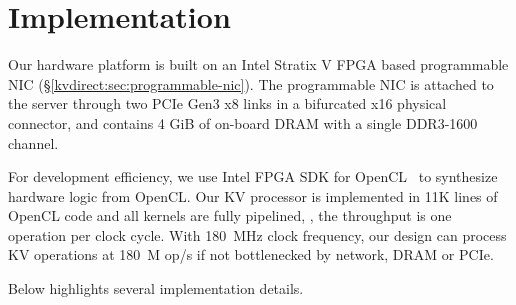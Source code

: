\section{Implementation}
\label{kvdirect:sec:implementation}

Our hardware platform is built on an Intel Stratix V FPGA based programmable NIC (\S\ref{kvdirect:sec:programmable-nic}).
The programmable NIC is attached to the server through two PCIe Gen3 x8 links in a bifurcated x16 physical connector, and contains 4 GiB of on-board DRAM with a single DDR3-1600 channel.

For development efficiency, we use Intel FPGA SDK for OpenCL~\cite{aoc} to synthesize hardware logic from OpenCL.
Our KV processor is implemented in 11K lines of OpenCL code and all kernels are fully pipelined, \ie, the throughput is one operation per clock cycle.
With 180~MHz clock frequency, our design can process KV operations at 180~M op/s if not bottlenecked by network, DRAM or PCIe.

%


Below highlights several implementation details.


